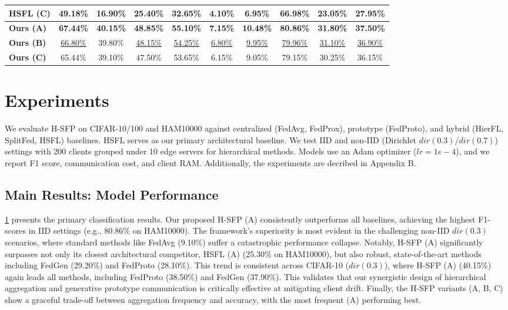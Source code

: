 \begin{table}
\begin{tabular}{l|ccc|ccc|ccc}
        HSFL (C) & 49.18\% & 16.90\% & 25.40\% & 32.65\% & 4.10\% & 6.95\% & 66.98\% & 23.05\% & 27.95\%\\
        \hline
        \textbf{Ours (A)} & \textbf{67.44\%} & \textbf{40.15\%} & \textbf{48.85\%} & \textbf{55.10\%} & \textbf{7.15\%} & \textbf{10.48\%} & \textbf{80.86\%} & \textbf{31.80\%} & \textbf{37.50\%}\\
        \textbf{Ours (B)} & \underline{66.80\%} & 39.80\% & \underline{48.15\%} & \underline{54.25\%} & \underline{6.80\%} & \underline{9.95\%} & \underline{79.96\%} & \underline{31.10\%} & \underline{36.90\%}\\
        \textbf{Ours (C)} & 65.44\% & 39.10\% & 47.50\% & 53.65\% & 6.15\% & 9.05\% & 79.15\% & 30.25\% & 36.15\%\\
        \hline
    \end{tabular}
    \label{tab:main_accuracy_results}
\end{table}
\section{Experiments}
\label{sec:experiments}
    We evaluate H-SFP on CIFAR-10/100 and HAM10000 against centralized (FedAvg, FedProx), prototype (FedProto), and hybrid (HierFL, SplitFed, HSFL) baselines. HSFL serves as our primary architectural baseline. We test IID and non-IID (Dirichlet $dir(0.3)$/$dir(0.7)$) settings with 200 clients grouped under 10 edge servers for hierarchical methods. Models use an Adam optimizer ($lr=1e-4$), and we report F1 score, communication cost, and client RAM. Additionally, the experiments are decribed in Appendix B.
\subsection{Main Results: Model Performance}
    \cref{tab:main_accuracy_results} presents the primary classification results. Our proposed H-SFP (A) consistently outperforms all baselines, achieving the highest F1-scores in IID settings (e.g., 80.86\% on HAM10000). The framework's superiority is most evident in the challenging non-IID $dir(0.3)$ scenarios, where standard methods like FedAvg (9.10\%) suffer a catastrophic performance collapse. Notably, H-SFP (A) significantly surpasses not only its closest architectural competitor, HSFL (A) (25.30\% on HAM10000), but also robust, state-of-the-art methods including FedGen (29.20\%) and FedProto (28.10\%). This trend is consistent across CIFAR-10 ($dir(0.3)$), where H-SFP (A) (40.15\%) again leads all methods, including FedProto (38.50\%) and FedGen (37.90\%). This validates that our synergistic design of hierarchical aggregation and generative prototype communication is critically effective at mitigating client drift. Finally, the H-SFP variants (A, B, C) show a graceful trade-off between aggregation frequency and accuracy, with the most frequent (A) performing best.


